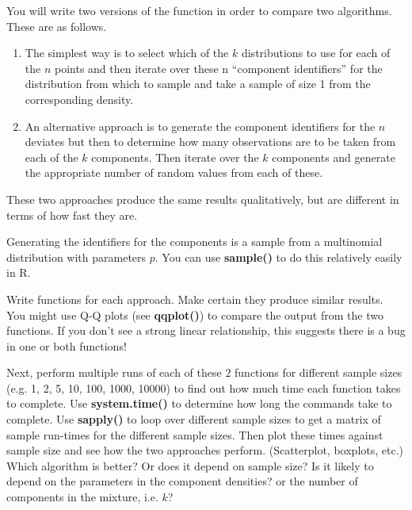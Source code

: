 \documentclass[11pt]{article}
\def\SFunction#1{\textbf{#1()}}
\begin{document}
\begin{enumerate}
\begin{comment}
 You can also write the code to be more general
 to accept different types of base random variables and even allow
 different types of distributions within the same mixture, e.g. \alpha
 Normal (mu sigma2) + (1- \alpha) Exp(theta), but you don't have to! 
\end{comment}
 
 You will write two versions of the function
 in order to compare two algorithms.
 These are as follows.
 \begin{enumerate}
 \item The simplest way is to select which of the $k$ distributions to
   use for each of the $n$ points and then iterate over these n ``component
   identifiers'' for the distribution from which to sample and take a
   sample of size 1 from the corresponding density.
  
 \item An alternative approach is to generate the component identifiers
   for the $n$ deviates but then to determine how many observations
   are to be taken from each of the $k$ components.  Then iterate over
   the $k$ components and generate the appropriate number of random
   values from each of these.
 \end{enumerate}

 These two approaches produce the same results qualitatively, but 
 are different in terms of how fast they are.

 Generating the identifiers for the components is a sample from
 a multinomial distribution with parameters $p$.  You can use
 \SFunction{sample} to do this relatively easily in R.

 Write functions for each approach.  Make certain they produce similar
 results.  You might use Q-Q plots (see \SFunction{qqplot}) to compare
 the output from the two functions.  If you don't see a strong linear
 relationship, this suggests there is a bug in one or both functions!

 Next, perform multiple runs of each of these $2$ functions for
 different sample sizes (e.g. 1, 2, 5, 10, 100, 1000, 10000) to find
 out how much time each function takes to complete.  Use
 \SFunction{system.time} to determine how long the commands take to
 complete.  Use \SFunction{sapply} to loop over different sample sizes
 to get a matrix of sample run-times for the different sample sizes.
 Then plot these times against sample size and see how the two
 approaches perform. (Scatterplot, boxplots, etc.)  Which algorithm is
 better?  Or does it depend on sample size? Is it likely to depend on
 the parameters in the component densities? or the number of
 components in the mixture, i.e. $k$?
  

\end{enumerate}
\end{document}
